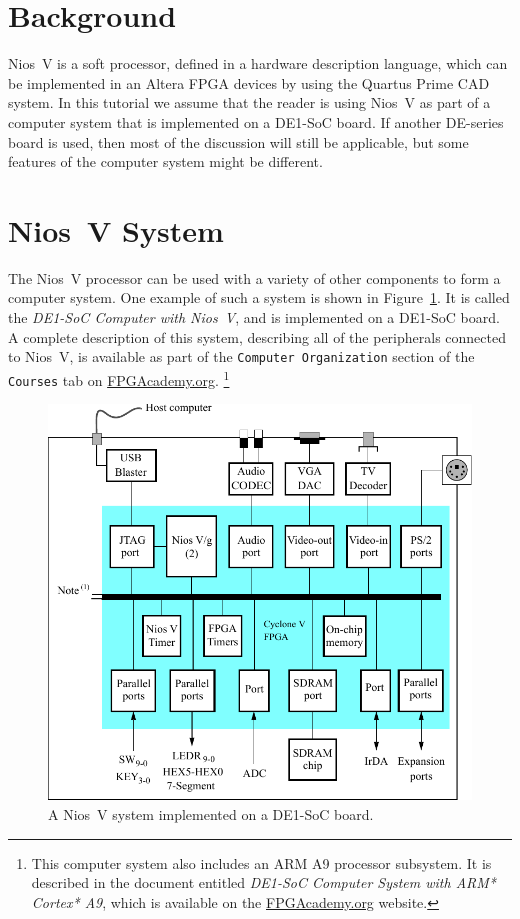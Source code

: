 \documentclass[11pt, twoside, pdftex]{article}
\begin{document}
\section{Background}

Nios~V is a soft processor, defined in a hardware description language,
which can be implemented in an Altera FPGA devices by using the 
Quartus Prime CAD system. 
In this tutorial we assume that the reader is using Nios~V as part of a computer system
that is implemented on a DE1-SoC board. If another DE-series board is used, then most of
the discussion will still be applicable, but some features of the computer system might 
be different.

\section{Nios~V System}
The Nios~V processor can be used with a variety of other components to form 
a computer system. One example of such a system is shown in Figure~\ref{fig:system}.
It is called the {\it DE1-SoC Computer with Nios~V}, and is implemented on a DE1-SoC board. 
A complete description of this system, describing all of the peripherals connected to
Nios~V, is available as part of the \texttt{Computer Organization} section of the
\texttt{Courses} tab on 
{\small \href{https://www.fpgacademy.org/courses.html} {FPGAcademy.org}}. 
\footnote{This computer system also includes an ARM A9 processor subsystem. It is 
described in the document entitled {\it DE1-SoC Computer System with ARM* Cortex* A9},
which is available on the 
{\small \href{https://www.fpgacademy.org/tutorials.html} {FPGAcademy.org}} website.}
 
\begin{figure}[H]
   \begin{center}
      \includegraphics[scale=0.85]{figures/Nios_V_system.pdf}
   \caption{A Nios~V system implemented on a DE1-SoC board.} 
	 \label{fig:system}
	 \end{center}
\end{figure}
\end{document}
